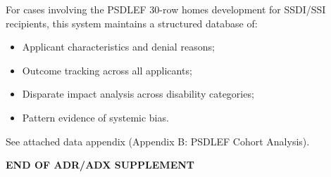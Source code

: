\documentclass[12pt,letterpaper]{article}
\begin{document}
\begin{singlespacing}
For cases involving the PSDLEF 30-row homes development for SSDI/SSI recipients, this system maintains a structured database of:
\begin{itemize}
    \item Applicant characteristics and denial reasons;
    \item Outcome tracking across all applicants;
    \item Disparate impact analysis across disability categories;
    \item Pattern evidence of systemic bias.
\end{itemize}

See attached data appendix (Appendix B: PSDLEF Cohort Analysis).

\vspace{24pt}
\noindent\textbf{END OF ADR/ADX SUPPLEMENT}

\end{singlespacing}
\end{document}
